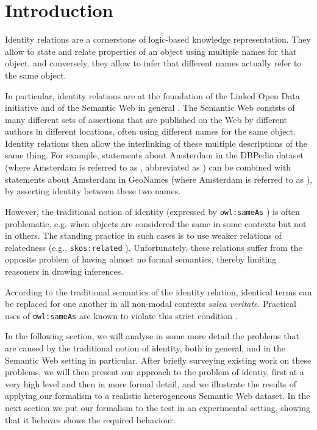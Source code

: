 \section{Introduction}
\label{sec:introduction}

Identity relations are a cornerstone of logic-based knowledge representation.
They allow to state and relate properties of an object using multiple names for that object, 
and conversely, they allow to infer that different names actually refer to the same object. 

In particular, identity relations are at the foundation of the Linked Open Data initiative
  and of the Semantic Web in general \cite{BizerCyganiakHeath2007}.
The Semantic Web consists of many different sets of assertions that are published on 
the Web by different authors in different locations, often using different names for 
the same object. Identity relations then 
allow the interlinking of these multiple descriptions of the same thing.
For example, statements about Amsterdam in the DBPedia dataset   
(where Amsterdam is referred to as 
, abbreviated as
) 
can be combined with statements about Amsterdam in GeoNames
(where Amsterdam is referred to as 
), by asserting identity between 
these two names. 

However, the traditional notion of identity
  (expressed by \texttt{owl:sameAs} \cite{MotikPaterschneiderGrau2012})
  is often problematic, e.g. when objects are considered the same in some
  contexts but not in others.
The standing practice in such cases is to use weaker relations of relatedness
  (e.g., \texttt{skos:related} \cite{MilesBechhofer2009}).
Unfortunately, these relations suffer from the opposite problem of having 
almost no formal semantics, thereby limiting reasoners in drawing inferences.

According to the traditional semantics of the identity relation,
  identical terms can be replaced for one another in all non-modal contexts
  \emph{salva veritate}.
Practical uses of \texttt{owl:sameAs} are known to violate this
  strict condition
  \cite{HalpinHayes2010,HalpinHayesMccuskerMcguinnessThompson2010}.

\begin{comment}
The SW is not only a formal model,
  but is also a social component that evolves over time,
  i.e. it is a social machine cite{Www2013}.
Being a social and symbolic system at the same time,
  meaning on the SW is denoted by its semantics as well as its pragmatics.
\end{comment}

In the following section, we will analyse in some more detail the problems that
are caused by the traditional notion of identity, both in general, and in the Semantic Web
setting in particular. After briefly surveying existing work on these problems, 
we will then present our approach to the problem of identiy, 
first at a very high level and then in more formal detail, and we illustrate
the results of applying our formalism to a realistic heterogeneous Semantic Web 
dataset. In the next section we 
put our formalism to the test in an experimental setting,
showing that it behaves shows the required behaviour. 
